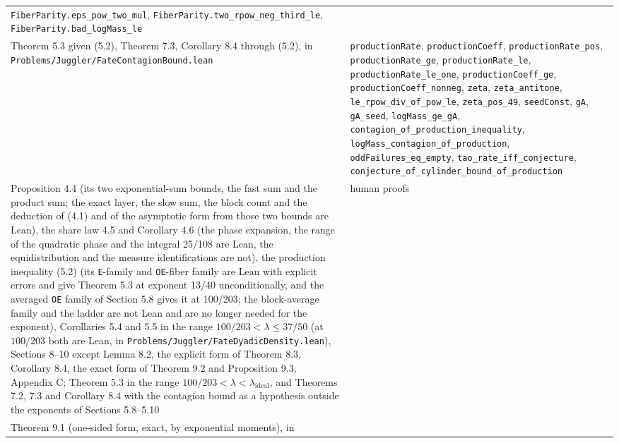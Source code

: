 \documentclass[11pt,a4paper]{article}
\begin{document}
\begin{longtable}[]{@{}
  >{\raggedright\arraybackslash}p{}
  >{\raggedright\arraybackslash}p{}@{}}
\texttt{\nolinkurl{FiberParity.eps_pow_two_mul}},
\texttt{\nolinkurl{FiberParity.two_rpow_neg_third_le}},
\texttt{\nolinkurl{FiberParity.bad_logMass_le}} \\
Theorem 5.3 given (5.2), Theorem 7.3, Corollary 8.4 through (5.2), in
\texttt{\nolinkurl{Problems/Juggler/FateContagionBound.lean}} &
\texttt{\nolinkurl{productionRate}},
\texttt{\nolinkurl{productionCoeff}},
\texttt{\nolinkurl{productionRate_pos}},
\texttt{\nolinkurl{productionRate_ge}},
\texttt{\nolinkurl{productionRate_le}},
\texttt{\nolinkurl{productionRate_le_one}},
\texttt{\nolinkurl{productionCoeff_ge}},
\texttt{\nolinkurl{productionCoeff_nonneg}}, \texttt{\nolinkurl{zeta}},
\texttt{\nolinkurl{zeta_antitone}},
\texttt{\nolinkurl{le_rpow_div_of_pow_le}},
\texttt{\nolinkurl{zeta_pos_49}}, \texttt{\nolinkurl{seedConst}},
\texttt{\nolinkurl{gA}}, \texttt{\nolinkurl{gA_seed}},
\texttt{\nolinkurl{logMass_ge_gA}},
\texttt{\nolinkurl{contagion_of_production_inequality}},
\texttt{\nolinkurl{logMass_contagion_of_production}},
\texttt{\nolinkurl{oddFailures_eq_empty}},
\texttt{\nolinkurl{tao_rate_iff_conjecture}},
\texttt{\nolinkurl{conjecture_of_cylinder_bound_of_production}} \\
Proposition 4.4 (its two exponential-sum bounds, the fast sum and the
product sum; the exact layer, the slow sum, the block count and the
deduction of (4.1) and of the asymptotic form from those two bounds are
Lean), the share law 4.5 and Corollary 4.6 (the phase expansion, the
range of the quadratic phase and the integral 25/108 are Lean, the
equidistribution and the measure identifications are not), the
production inequality (5.2) (its \texttt{\nolinkurl{E}}-family and
\texttt{\nolinkurl{OE}}-fiber family are Lean with explicit errors and
give Theorem 5.3 at exponent 13/40 unconditionally, and the averaged
\texttt{\nolinkurl{OE}} family of Section 5.8 gives it at 100/203; the
block-average family and the ladder are not Lean and are no longer
needed for the exponent), Corollaries 5.4 and 5.5 in the range
\(100/203<\lambda\le37/50\) (at \(100/203\) both are Lean, in
\texttt{\nolinkurl{Problems/Juggler/FateDyadicDensity.lean}}), Sections
8--10 except Lemma 8.2, the explicit form of Theorem 8.3, Corollary 8.4,
the exact form of Theorem 9.2 and Proposition 9.3, Appendix C; Theorem
5.3 in the range \(100/203<\lambda<\lambda_{\mathrm{ideal}}\), and
Theorems 7.2, 7.3 and Corollary 8.4 with the contagion bound as a
hypothesis outside the exponents of Sections 5.8--5.10 & human proofs \\
Theorem 9.1 (one-sided form, exact, by exponential moments), in

\end{longtable}
\end{document}
